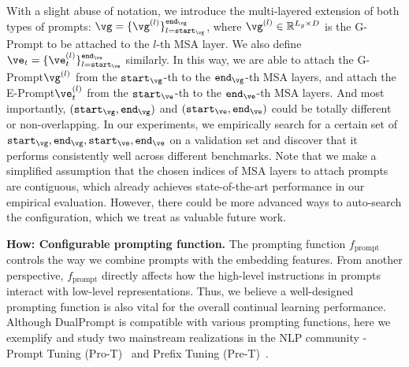 \documentclass[runningheads]{llncs}
\newcommand{\zifeng}[1]{\textcolor{red}{Zifeng: #1}}
\newcommand{\zizhaoz}[1]{\textcolor{green}{Zizhao: #1}}
\newcommand{\method}{DualPrompt\xspace}
\newcommand{\gprompt}{G-Prompt\xspace}
\newcommand{\eprompt}{E-Prompt\xspace}
\newcommand{\combiner}{PAF\xspace}
\def\pfunc{{f_{\text{prompt}}}}
\def \iep{\texttt{start}_{\ve}}
\def \jep{\texttt{end}_{\ve}}
\def \igp{\texttt{start}_{\vg}}
\def \jgp{\texttt{end}_{\vg}}
\begin{document}
With a slight abuse of notation, we introduce the multi-layered extension of both types of prompts: $\vg = \{\vg^{(l)}\}_{l=\igp}^{\jgp}$, where $\vg^{(l)} \in \mathbb{R}^{L_g \times D}$ is the G-Prompt to be attached to the $l$-th MSA layer. We also define $\ve_t = \{\ve^{(l)}_t\}_{l=\iep}^{\jep}$ similarly. In this way, we are able to attach the \gprompt $\vg^{(l)}$ from the $\igp$-th to the $\jgp$-th MSA layers, and attach the \eprompt $\ve^{(l)}_t$ from the $\iep$-th to the $\jep$-th MSA layers. And most importantly, $(\igp, \jgp)$ and $(\iep, \jep)$ could be totally different or non-overlapping. In our experiments, we empirically search for a certain set of $\igp, \jgp, \iep, \jep$ on a validation set and discover that it performs consistently well across different benchmarks. Note that we make a simplified assumption that the chosen indices of MSA layers to attach prompts are contiguous, which already achieves state-of-the-art performance in our empirical evaluation. However, there could be more advanced ways to auto-search the configuration, which we treat as valuable future work.



\textbf{How: Configurable prompting function.} %
The prompting function $\pfunc$ controls the way we combine prompts with the embedding features. From another perspective, $\pfunc$ directly affects how the high-level instructions in prompts interact with low-level representations. Thus, we believe a well-designed prompting function is also vital for the overall continual learning performance. Although \method is  compatible with various prompting functions, here we exemplify and study two mainstream realizations in the NLP community - Prompt Tuning (Pro-T)~\cite{lester2021power} and Prefix Tuning (Pre-T)~\cite{li2021prefix}. 
\end{document}
